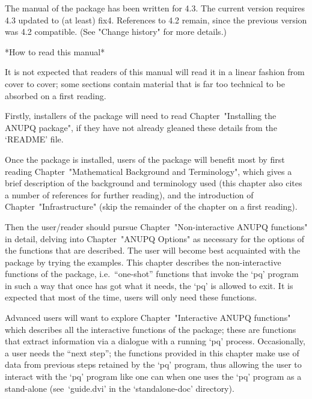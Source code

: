 \endlist


The manual of the {\ANUPQ} package has been written for {\GAP}  4.3.  The
current  version  requires  {\GAP}  4.3  updated  to  (at  least)   fix4.
References to {\GAP} 4.2 remain, since the previous  version  was  {\GAP}
4.2 compatible. (See "Change history" for more details.)

*How to read this manual*

It is not expected that readers of this manual will read it in  a  linear
fashion from cover to cover; some sections contain material that  is  far
too technical to be absorbed on a first reading.

Firstly,  installers  of  the  {\ANUPQ}  package  will   need   to   read
Chapter~"Installing the ANUPQ package", if they have not already  gleaned
these details from the `README' file.

Once the {\ANUPQ} package is installed, users  of  the  {\ANUPQ}  package
will benefit most by first reading Chapter~"Mathematical  Background  and
Terminology", which gives a  brief  description  of  the  background  and
terminology used (this chapter also cites  a  number  of  references  for
further reading), and the introduction of Chapter~"Infrastructure"  (skip
the remainder of the chapter on a first reading).

Then  the  user/reader  should  pursue   Chapter~"Non-interactive   ANUPQ
functions" in detail, delving into Chapter~"ANUPQ Options"  as  necessary
for the options of the functions that are described. The user will become
best acquainted with the {\ANUPQ} package by trying  the  examples.  This
chapter describes the non-interactive functions of the {\ANUPQ}  package,
i.e.~``one-shot'' functions that invoke the `pq' program in  such  a  way
that once {\GAP} has got what it needs, the `pq' is allowed to  exit.  It
is expected that most of the time, users will only need these functions.

Advanced users will want to explore Chapter~"Interactive ANUPQ functions"
which describes all the interactive functions of  the  {\ANUPQ}  package;
these are functions that  extract  information  via  a  dialogue  with  a
running `pq' process. Occasionally, a user needs the ``next  step'';  the
functions provided in this chapter make use of data from  previous  steps
retained by the `pq' program, thus allowing the user to interact with the
`pq' program like one can when one uses the `pq' program as a stand-alone
(see~`guide.dvi' in the `standalone-doc' directory).

